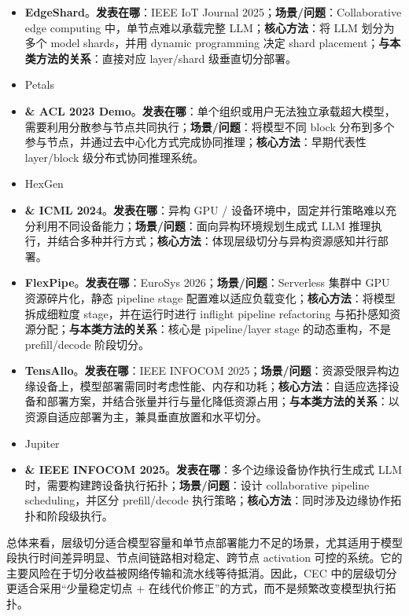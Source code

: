 \documentclass[a4paper,twocolumn,10pt]{ctexart}
\begin{document}
\begin{itemize}
\item \textbf{EdgeShard}。\textbf{发表在哪}：IEEE IoT Journal 2025；\textbf{场景/问题}：Collaborative edge computing 中，单节点难以承载完整 LLM；\textbf{核心方法}：将 LLM 划分为多个 model shards，并用 dynamic programming 决定 shard placement；\textbf{与本类方法的关系}：直接对应 layer/shard 级垂直切分部署。
\item Petals
\item \textbf{\& ACL 2023 Demo}。\textbf{发表在哪}：单个组织或用户无法独立承载超大模型，需要利用分散参与节点共同执行；\textbf{场景/问题}：将模型不同 block 分布到多个参与节点，并通过去中心化方式完成协同推理；\textbf{核心方法}：早期代表性 layer/block 级分布式协同推理系统。
\item HexGen
\item \textbf{\& ICML 2024}。\textbf{发表在哪}：异构 GPU / 设备环境中，固定并行策略难以充分利用不同设备能力；\textbf{场景/问题}：面向异构环境规划生成式 LLM 推理执行，并结合多种并行方式；\textbf{核心方法}：体现层级切分与异构资源感知并行部署。
\item \textbf{FlexPipe}。\textbf{发表在哪}：EuroSys 2026；\textbf{场景/问题}：Serverless 集群中 GPU 资源碎片化，静态 pipeline stage 配置难以适应负载变化；\textbf{核心方法}：将模型拆成细粒度 stage，并在运行时进行 inflight pipeline refactoring 与拓扑感知资源分配；\textbf{与本类方法的关系}：核心是 pipeline/layer stage 的动态重构，不是 prefill/decode 阶段切分。
\item \textbf{TensAllo}。\textbf{发表在哪}：IEEE INFOCOM 2025；\textbf{场景/问题}：资源受限异构边缘设备上，模型部署需同时考虑性能、内存和功耗；\textbf{核心方法}：自适应选择设备和部署方案，并结合张量并行与量化降低资源占用；\textbf{与本类方法的关系}：以资源自适应部署为主，兼具垂直放置和水平切分。
\item Jupiter
\item \textbf{\& IEEE INFOCOM 2025}。\textbf{发表在哪}：多个边缘设备协作执行生成式 LLM 时，需要构建跨设备执行拓扑；\textbf{场景/问题}：设计 collaborative pipeline scheduling，并区分 prefill/decode 执行策略；\textbf{核心方法}：同时涉及边缘协作拓扑和阶段级执行。
\end{itemize}





总体来看，层级切分适合模型容量和单节点部署能力不足的场景，尤其适用于模型段执行时间差异明显、节点间链路相对稳定、跨节点 activation 可控的系统。它的主要风险在于切分收益被网络传输和流水线等待抵消。因此，CEC 中的层级切分更适合采用“少量稳定切点 + 在线代价修正”的方式，而不是频繁改变模型执行拓扑。
\end{document}
